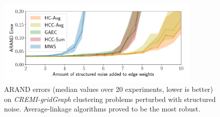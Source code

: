 \begin{figure}[tbp]
\centering
\includegraphics[width=0.87\textwidth,trim=0.2in 0.17in 0.2in 0.2in,clip]{./figures/GASP/noise_plots_adapted-rand_1.pdf}
        \caption{
ARAND errors (median values over 20 experiments, lower is better) on \emph{CREMI-gridGraph} clustering problems perturbed with structured noise. Average-linkage algorithms proved to be the most robust.
}\label{fig:scores_structured_noise}
\end{figure}


